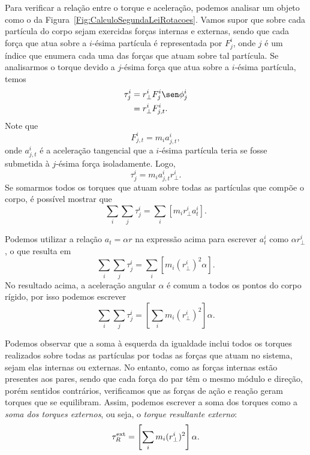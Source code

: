 Para verificar a relação entre o torque e aceleração, podemos analisar um objeto como o da Figura~\ref{Fig:CalculoSegundaLeiRotacoes}. Vamos supor que sobre cada partícula do corpo sejam exercidas forças internas e externas, sendo que cada força que atua sobre a $i$-ésima partícula é representada por $F_j^i$, onde $j$ é um índice que enumera cada uma das forças que atuam sobre tal partícula. Se analisarmos o torque devido a $j$-ésima força que atua sobre a $i$-ésima partícula, temos
\begin{align}
	\tau_j^i &= r_\perp^i F_j^i \sen\phi_j^i \\
	&= r_\perp^i F_{j,t}^i.
\end{align}
%
Note que
\begin{equation}
	F_{j,t}^{i} = m_i a_{j,t}^{i},
\end{equation}
%
onde $a_{j,t}^i$ é a aceleração tangencial que a $i$-ésima partícula teria se fosse submetida à $j$-ésima força isoladamente.
%
Logo,
\begin{equation}
	\tau_j^i = m_i a_{j,t}^{i} r_\perp^i.
\end{equation}
%
Se somarmos todos os torques que atuam sobre todas as partículas que compõe o corpo, é possível mostrar que
\begin{equation}
	\sum_i \sum_j \tau_j^i = \sum_{i}[m_i r_\perp^i a_{t}^i].
\end{equation}

Podemos utilizar a relação $a_t = \alpha r$ na expressão acima para escrever $a_{t}^i$ como $\alpha r_\perp^i$, o que resulta em
\begin{equation}
	\sum_i \sum_j \tau_j^i = \sum_{i}[m_i (r_\perp^i)^2 \alpha].
\end{equation}
%
No resultado acima, a aceleração angular $\alpha$ é comum a todos os pontos do corpo rígido, por isso podemos escrever
\begin{equation}
	\sum_i \sum_j \tau_j^i =  \left[\sum_{i} m_i (r_\perp^i)^2\right] \alpha.
\end{equation}

Podemos observar que a soma à esquerda da igualdade inclui todos os torques realizados sobre todas as partículas por todas as forças que atuam no sistema, sejam elas internas ou externas. No entanto, como as forças internas estão presentes aos pares, sendo que cada força do par têm o mesmo módulo e direção, porém sentidos contrários, verificamos que as forças de ação e reação geram torques que se equilibram. Assim, podemos escrever a soma dos torques como a \emph{soma dos torques externos}, ou seja, o \emph{torque resultante externo}:
\begin{equation}\label{Eq:ProtoSegundaLeiRotacoes}
    \tau_R^{\rm{ext}} = \left[\sum_{i} m_i (r_\perp^i)^2\right] \alpha.
\end{equation}
% 

